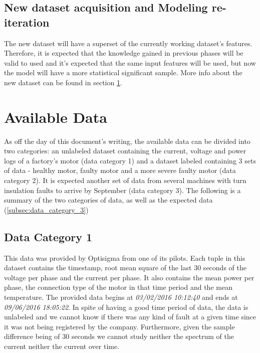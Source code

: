 \subsection{New dataset acquisition and Modeling re-iteration}
\label{subsec:reiteration}

The new dataset will have a superset of the currently working dataset's features. Therefore, it is expected that the knowledge gained in previous phases will be valid to used and it's expected that the same input features will be used, but now the model will have a more statistical significant sample. More info about the new dataset can be found in section \ref{sec:available_data}.


\section{Available Data}
\label{sec:available_data}

As off the day of this document's writing, the available data can be divided into two categories: an unlabeled dataset containing the current, voltage and power logs of a factory's motor (data category 1) and a dataset labeled containing 3 sets of data - healthy motor, faulty motor and a more severe faulty motor (data category 2).
It is expected another set of data from several machines with turn insulation faults to arrive by September (data category 3).
The following is a summary of the two categories of data, as well as the expected data (\ref{subsec:data_category_3})

\subsection{Data Category 1}
\label{subsec:data_category_1}

This data was provided by Optisigma from one of its pilots. Each tuple in this dataset contains the timestamp, root mean square of the last 30 seconds of the voltage per phase and the  current per phase. It also contains the mean power per phase, the connection type of the motor in that time period and the mean temperature.
The provided data begins at \emph{03/02/2016  10:12:40} and ends at \emph{09/06/2016  18:05:22}.
In spite of having a good time period of data, the data is unlabeled and we cannot know if there was any kind of fault at a given time since it was not being registered by the company.
Furthermore, given the sample difference being of 30 seconds we cannot study neither the spectrum of the current neither the current over time.

